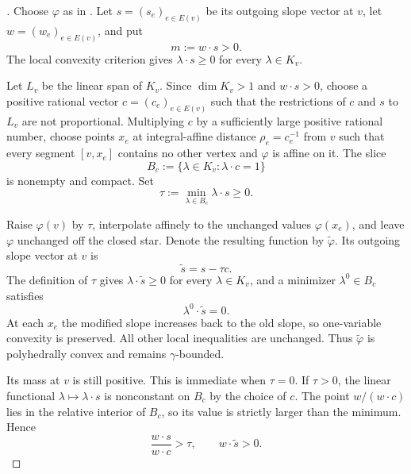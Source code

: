 \begin{proof}[]
Choose $\varphi$ as in
.  Let
$s=(s_e)_{e\in E(v)}$ be its outgoing slope vector at $v$, let
$w=(w_e)_{e\in E(v)}$, and put
\[
                         m:=w\mathbin{\cdot}s>0.
\]
The local convexity criterion gives
$\lambda\mathbin{\cdot}s\geq0$ for every $\lambda\in K_v$.

Let $L_v$ be the linear span of $K_v$.  Since $\dim K_v>1$ and
$w\mathbin{\cdot}s>0$, choose a positive rational vector
$c=(c_e)_{e\in E(v)}$ such that the restrictions of $c$ and $s$ to $L_v$
are not proportional.  Multiplying $c$ by a sufficiently large positive
rational number, choose points $x_e$ at integral-affine distance
$\rho_e=c_e^{-1}$ from $v$ such that every segment $[v,x_e]$ contains no
other vertex and $\varphi$ is affine on it.  The slice
\[
                       B_c:=\{\lambda\in K_v:\lambda\mathbin{\cdot}c=1\}
\]
is nonempty and compact.  Set
\[
                       \tau:=\min_{\lambda\in B_c}
                       \lambda\mathbin{\cdot}s\geq0.
\]

Raise $\varphi(v)$ by $\tau$, interpolate affinely to the unchanged values
$\varphi(x_e)$, and leave $\varphi$ unchanged off the closed star.  Denote
the resulting function by $\widetilde\varphi$.  Its outgoing slope vector
at $v$ is
\[
                         \widetilde s=s-\tau c.
\]
The definition of $\tau$ gives
$\lambda\mathbin{\cdot}\widetilde s\geq0$ for every $\lambda\in K_v$,
and a minimizer $\lambda^0\in B_c$ satisfies
\begin{equation}
                  \lambda^0\mathbin{\cdot}\widetilde s=0.
                  \label{eq:frontier-polyhedral-supporting-relation}
\end{equation}
At each $x_e$ the modified slope increases back to the old slope, so
one-variable convexity is preserved.  All other local inequalities are
unchanged.  Thus $\widetilde\varphi$ is polyhedrally convex and remains
$\gamma$-bounded.

Its mass at $v$ is still positive.  This is immediate when $\tau=0$.
If $\tau>0$, the linear functional
$\lambda\mapsto\lambda\mathbin{\cdot}s$ is nonconstant on $B_c$ by the
choice of $c$.  The point
$w/(w\mathbin{\cdot}c)$ lies in the relative interior of $B_c$, so its
value is strictly larger than the minimum.  Hence
\begin{equation}
 \frac{w\mathbin{\cdot}s}{w\mathbin{\cdot}c}>\tau,
 \qquad
 w\mathbin{\cdot}\widetilde s>0.
 \label{eq:frontier-polyhedral-positive-projected-mass}
\end{equation}


\end{proof}
